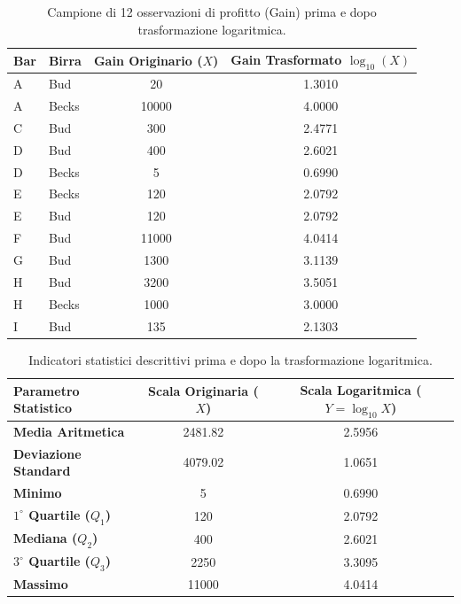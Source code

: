 \begin{table}[H]
    \centering
    \small
    \begin{tabular}{llcc}
        \toprule
        \textbf{Bar} & \textbf{Birra} & \textbf{Gain Originario ($X$)} & \textbf{Gain Trasformato $\log_{10}(X)$} \\
        \midrule
        A & Bud   & 20    & 1.3010 \\
        A & Becks & 10000 & 4.0000 \\
        C & Bud   & 300   & 2.4771 \\
        D & Bud   & 400   & 2.6021 \\
        D & Becks & 5     & 0.6990 \\
        E & Becks & 120   & 2.0792 \\
        E & Bud   & 120   & 2.0792 \\
        F & Bud   & 11000 & 4.0414 \\
        G & Bud   & 1300  & 3.1139 \\
        H & Bud   & 3200  & 3.5051 \\
        H & Becks & 1000  & 3.0000 \\
        I & Bud   & 135   & 2.1303 \\
        \bottomrule
    \end{tabular}
    \caption{Campione di 12 osservazioni di profitto (Gain) prima e dopo trasformazione logaritmica.}
    \label{tab:dm-log-transform-sample}
\end{table}

\begin{table}[H]
    \centering
    \small
    \begin{tabularx}{\textwidth}{Xcc}
        \toprule
        \textbf{Parametro Statistico} & \textbf{Scala Originaria ($X$)} & \textbf{Scala Logaritmica ($Y = \log_{10} X$)} \\
        \midrule
        \textbf{Media Aritmetica} & 2481.82 & 2.5956 \\
        \textbf{Deviazione Standard} & 4079.02 & 1.0651 \\
        \textbf{Minimo} & 5 & 0.6990 \\
        \textbf{$1^\circ$ Quartile ($Q_1$)} & 120 & 2.0792 \\
        \textbf{Mediana ($Q_2$)} & 400 & 2.6021 \\
        \textbf{$3^\circ$ Quartile ($Q_3$)} & 2250 & 3.3095 \\
        \textbf{Massimo} & 11000 & 4.0414 \\
        \bottomrule
    \end{tabularx}
    \caption{Indicatori statistici descrittivi prima e dopo la trasformazione logaritmica.}
    \label{tab:dm-log-transform-stats}
\end{table}

